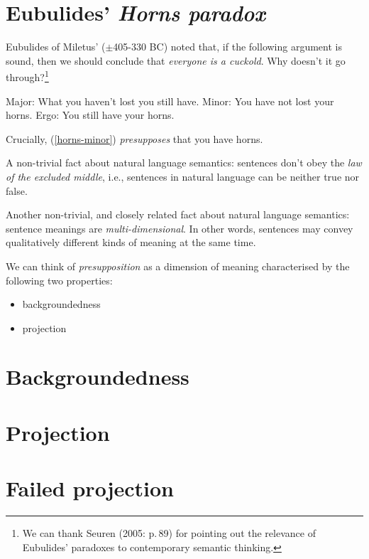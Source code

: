 \documentclass[cronos,landscape,paper=letter]{ling-handout}
\begin{document}
\section{Eubulides' \textit{Horns paradox}}

Eubulides of Miletus' ($±$405-330 BC) noted that, if the following argument is sound, then we should conclude that \textit{everyone is a cuckold}. Why doesn't it go through?\footnote{We can thank Seuren (2005: p.\,89) for pointing out the relevance of Eubulides' paradoxes to contemporary semantic thinking.}

\pex
\a Major: What you haven't lost you still have.
\a\label{horns-minor}Minor: You have not lost your horns.
\a Ergo: You still have your horns.
\xe

Crucially, (\ref{horns-minor}) \textit{presupposes} that you have horns.

A non-trivial fact about natural language semantics: sentences don't obey the \textit{law of the excluded middle}, i.e., sentences in natural language can be neither true nor false.

Another non-trivial, and closely related fact about natural language semantics: sentence meanings are \textit{multi-dimensional}. In other words, sentences may convey qualitatively different kinds of meaning at the same time.

We can think of \textit{presupposition} as a dimension of meaning characterised by the following two properties:

\begin{itemize}

  \item backgroundedness

  \item projection

\end{itemize}

\section{Backgroundedness}

\section{Projection}

\section{Failed projection}
\end{document}
